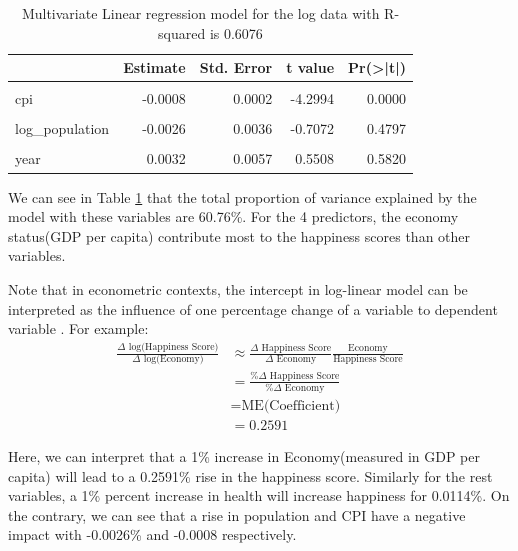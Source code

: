 \documentclass[11pt,a4paper,]{article}
\begin{document}
\begin{table}

\caption{\label{tab:mle}Multivariate Linear regression model for the log data with R-squared is 0.6076}
\centering
\begin{tabular}[t]{l|r|r|r|r}
\hline
  & Estimate & Std. Error & t value & Pr(>|t|)\\
\hline
\cellcolor{gray!6}{(Intercept)} & \cellcolor{gray!6}{-4.5999} & \cellcolor{gray!6}{11.5632} & \cellcolor{gray!6}{-0.3978} & \cellcolor{gray!6}{0.6909}\\
\hline
cpi & -0.0008 & 0.0002 & -4.2994 & 0.0000\\
\hline
\cellcolor{gray!6}{log\_eco} & \cellcolor{gray!6}{0.2591} & \cellcolor{gray!6}{0.0094} & \cellcolor{gray!6}{27.5487} & \cellcolor{gray!6}{0.0000}\\
\hline
log\_population & -0.0026 & 0.0036 & -0.7072 & 0.4797\\
\hline
\cellcolor{gray!6}{log\_health} & \cellcolor{gray!6}{0.0114} & \cellcolor{gray!6}{0.0042} & \cellcolor{gray!6}{2.7419} & \cellcolor{gray!6}{0.0063}\\
\hline
year & 0.0032 & 0.0057 & 0.5508 & 0.5820\\
\hline
\end{tabular}
\end{table}

We can see in Table \ref{tab:mle} that the total proportion of variance explained by the model with these variables are 60.76\%. For the 4 predictors, the economy status(GDP per capita) contribute most to the happiness scores than other variables.

Note that in econometric contexts, the intercept in log-linear model can be interpreted as the influence of one percentage change of a variable to dependent variable \autocite{benoit2011}. For example:
\begin{align*}
\frac{\Delta \text{ log(Happiness Score)}}{\Delta \text{ log(Economy)}} &\approx \frac{\Delta \text{ Happiness Score}}{\Delta \text{ Economy} }\frac{\text{Economy}}{\text{Happiness Score}}\\
&=\frac{\% \Delta \text{ Happiness Score}}{\% \Delta \text{ Economy}} \nonumber\\
&= \text{ME(Coefficient)}\nonumber\\
&= 0.2591
\end{align*}

Here, we can interpret that a 1\% increase in Economy(measured in GDP per capita) will lead to a 0.2591\% rise in the happiness score. Similarly for the rest variables, a 1\% percent increase in health will increase happiness for 0.0114\%. On the contrary, we can see that a rise in population and CPI have a negative impact with -0.0026\% and -0.0008 respectively.
\end{document}
